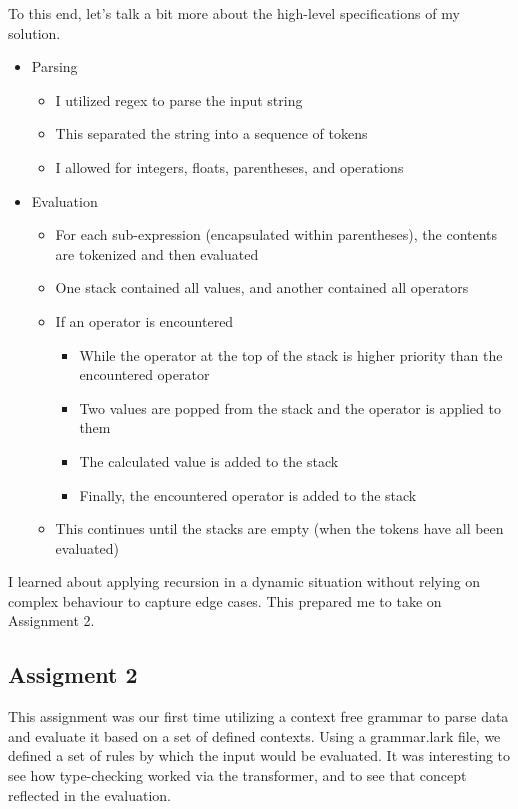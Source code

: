 \documentclass{article}
\theoremstyle{theorem}
\theoremstyle{definition}
\theoremstyle{remark}
\begin{document}
To this end, let's talk a bit more about the high-level specifications of my solution.
\begin{itemize}
  \item Parsing
    \begin{itemize}
    \item I utilized regex to parse the input string
    \item This separated the string into a sequence of tokens
    \item I allowed for integers, floats, parentheses, and operations
    \end{itemize}
  \item Evaluation
    \begin{itemize}
      \item For each sub-expression (encapsulated within parentheses), the contents are tokenized and then evaluated
      \item One stack contained all values, and another contained all operators
      \item If an operator is encountered
        \begin{itemize}
          \item While the operator at the top of the stack is higher priority than the encountered operator
          \item Two values are popped from the stack and the operator is applied to them
          \item The calculated value is added to the stack
          \item Finally, the encountered operator is added to the stack
        \end{itemize}
      \item This continues until the stacks are empty (when the tokens have all been evaluated)
    \end{itemize}
\end{itemize}

I learned about applying recursion in a dynamic situation without relying on complex behaviour to capture edge cases. This prepared me to take on Assignment 2.\\

\subsection{Assigment 2}
This assignment was our first time utilizing a context free grammar to parse data and evaluate it based on a set of defined contexts. Using a grammar.lark file, we defined a set of rules by which the input would be evaluated. It was interesting to see how type-checking worked via the transformer, and to see that concept reflected in the evaluation.
\end{document}
